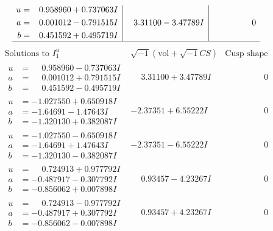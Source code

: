\documentclass[1p]{elsarticle_modified}
\theoremstyle{definition}
\newcommand{\I}{\sqrt{-1}}
\begin{document}
$$\begin{array}{c|c|c}
\begin{aligned}
u &= \phantom{-}0.958960 + 0.737063 I \\
a &= \phantom{-}0.001012 - 0.791515 I \\
b &= \phantom{-}0.451592 + 0.495719 I\end{aligned}
 & \phantom{-}3.31100 - 3.47789 I & \phantom{-0.000000 } 0\\
 \hline 
 \end{array}$$\newpage$$\begin{array}{c|c|c}  
\text{Solutions to }I^u_{1}& \I (\text{vol} + \sqrt{-1}CS) & \text{Cusp shape}\\
 \hline 
\begin{aligned}
u &= \phantom{-}0.958960 - 0.737063 I \\
a &= \phantom{-}0.001012 + 0.791515 I \\
b &= \phantom{-}0.451592 - 0.495719 I\end{aligned}
 & \phantom{-}3.31100 + 3.47789 I & \phantom{-0.000000 } 0 \\ \hline\begin{aligned}
u &= -1.027550 + 0.650918 I \\
a &= -1.64691 - 1.47643 I \\
b &= -1.320130 + 0.382087 I\end{aligned}
 & -2.37351 + 6.55222 I & \phantom{-0.000000 } 0 \\ \hline\begin{aligned}
u &= -1.027550 - 0.650918 I \\
a &= -1.64691 + 1.47643 I \\
b &= -1.320130 - 0.382087 I\end{aligned}
 & -2.37351 - 6.55222 I & \phantom{-0.000000 } 0 \\ \hline\begin{aligned}
u &= \phantom{-}0.724913 + 0.977792 I \\
a &= -0.487917 - 0.307792 I \\
b &= -0.856062 + 0.007898 I\end{aligned}
 & \phantom{-}0.93457 - 4.23267 I & \phantom{-0.000000 } 0 \\ \hline\begin{aligned}
u &= \phantom{-}0.724913 - 0.977792 I \\
a &= -0.487917 + 0.307792 I \\
b &= -0.856062 - 0.007898 I\end{aligned}
 & \phantom{-}0.93457 + 4.23267 I & \phantom{-0.000000 } 0 \\ \hline\begin{aligned}

\end{aligned}
\end{array}$$
\end{document}
